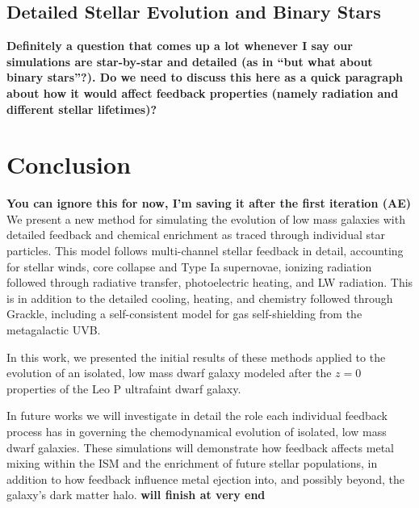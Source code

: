 \documentclass[twocolumn]{aastex61}
\begin{document}
\subsection{Detailed Stellar Evolution and Binary Stars}
\textbf{Definitely a question that comes up a lot whenever I say our simulations are star-by-star and detailed (as in ``but what about binary stars''?). Do we need to discuss this here as a quick paragraph about how it would affect feedback properties (namely radiation and different stellar lifetimes)?}

\section{Conclusion}
\textbf{You can ignore this for now, I'm saving it after the first iteration (AE)}
We present a new method for simulating the evolution of low mass galaxies with detailed feedback and chemical enrichment as traced through individual star particles. This model follows multi-channel stellar feedback in detail, accounting for stellar winds, core collapse and Type Ia supernovae, ionizing radiation followed through radiative transfer, photoelectric heating, and LW radiation. This is in addition to the detailed cooling, heating, and chemistry followed through Grackle, including a self-consistent model for gas self-shielding from the metagalactic UVB.

In this work, we presented the initial results of these methods applied to the evolution of an isolated, low mass dwarf galaxy modeled after the $z=0$ properties of the Leo P ultrafaint dwarf galaxy. 

In future works we will investigate in detail the role each individual feedback process has in governing the chemodynamical evolution of isolated, low mass dwarf galaxies. These simulations will demonstrate how feedback affects metal mixing within the ISM and the enrichment of future stellar populations, in addition to how feedback influence metal ejection into, and possibly beyond, the galaxy's dark matter halo. \textbf{will finish at very end}

%
%




\appendix
\end{document}
